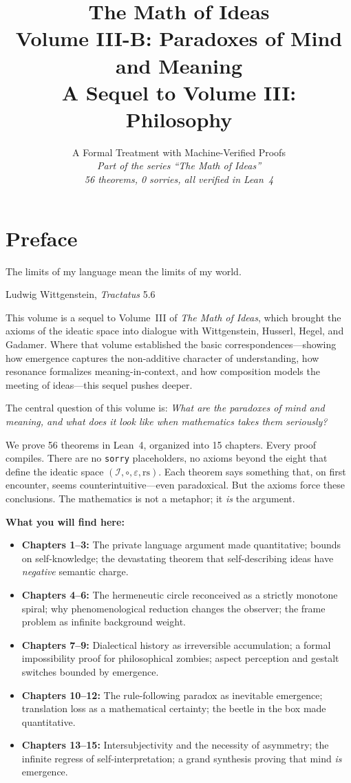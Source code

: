 \documentclass[11pt,oneside]{book}
\title{\Huge\bfseries The Math of Ideas\\[0.3em]
\LARGE Volume III-B: Paradoxes of Mind and Meaning\\[0.5em]
\Large A Sequel to Volume III: Philosophy}
\author{A Formal Treatment with Machine-Verified Proofs\\[0.3em]
\normalsize\textit{Part of the series ``The Math of Ideas''}\\[0.2em]
\normalsize\textit{56 theorems, 0 sorries, all verified in Lean~4}}
\date{}
\theoremstyle{plain}
\theoremstyle{definition}
\theoremstyle{remark}
\newcommand{\rs}{\mathrm{rs}}
\newcommand{\compose}{\circ}
\newcommand{\void}{\varepsilon}
\newcommand{\IS}{\mathcal{I}}
\begin{document}
\maketitle

\frontmatter

\chapter*{Preface}

\epigraph{The limits of my language mean the limits of my world.}{Ludwig Wittgenstein, \textit{Tractatus} 5.6}

This volume is a sequel to Volume~III of \emph{The Math of Ideas}, which brought the
axioms of the ideatic space into dialogue with Wittgenstein, Husserl, Hegel, and Gadamer.
Where that volume established the basic correspondences---showing how emergence captures
the non-additive character of understanding, how resonance formalizes meaning-in-context,
and how composition models the meeting of ideas---this sequel pushes deeper.

The central question of this volume is: \emph{What are the paradoxes of mind and meaning,
and what does it look like when mathematics takes them seriously?}

We prove 56 theorems in Lean~4, organized into 15 chapters.  Every proof compiles.
There are no \texttt{sorry} placeholders, no axioms beyond the eight that define
the ideatic space $(\IS, \compose, \void, \rs)$.  Each theorem says something that,
on first encounter, seems counterintuitive---even paradoxical.  But the axioms force
these conclusions.  The mathematics is not a metaphor; it \emph{is} the argument.

\medskip

\noindent\textbf{What you will find here:}

\begin{itemize}[leftmargin=2em]
\item \textbf{Chapters 1--3:} The private language argument made quantitative;
  bounds on self-knowledge; the devastating theorem that self-describing ideas
  have \emph{negative} semantic charge.

\item \textbf{Chapters 4--6:} The hermeneutic circle reconceived as a strictly
  monotone spiral; why phenomenological reduction changes the observer;
  the frame problem as infinite background weight.

\item \textbf{Chapters 7--9:} Dialectical history as irreversible accumulation;
  a formal impossibility proof for philosophical zombies;
  aspect perception and gestalt switches bounded by emergence.

\item \textbf{Chapters 10--12:} The rule-following paradox as inevitable emergence;
  translation loss as a mathematical certainty;
  the beetle in the box made quantitative.

\item \textbf{Chapters 13--15:} Intersubjectivity and the necessity of asymmetry;
  the infinite regress of self-interpretation;
  a grand synthesis proving that mind \emph{is} emergence.
\end{itemize}
\end{document}
